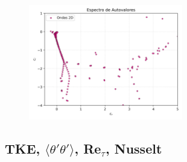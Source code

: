 \begin{figure}[H]
  \centering
    \includegraphics[width=0.6\textwidth]{figures/cap6/Re5000-Pr071-Ri1Em3/Re5000-Pr071-Ri1Em3_eigenvals.png}
  \caption{}
  \label{fig:spectra-Re5000-Pr0071}
\end{figure}


\subsection{TKE, $\langle \theta' \theta' \rangle$, Re$_{\tau}$, Nusselt }

\begin{figure}[H]
  \centering  

  \caption{}
  \label{fig:tetavar-nu-Re5000-Pr071-Ri1Em3}
\end{figure}


